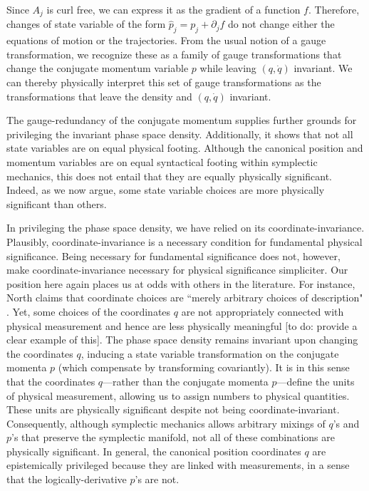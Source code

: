 \documentclass[letterpaper]{article}
\begin{document}
Since $A_j$ is curl free, we can express it as the gradient of a function $f$. Therefore, changes of state variable of the form $\hat{p}_j = p_j + \partial_j f$ do not change either the equations of motion or the trajectories. From the usual notion of a gauge transformation, we recognize these as a family of gauge transformations that change the conjugate momentum variable $p$ while leaving $(q,\dot{q}) $ invariant. We can thereby physically interpret this set of gauge transformations as the transformations that leave the density and $(q,\dot{q}) $ invariant.

The gauge-redundancy of the conjugate momentum supplies further grounds for privileging the invariant phase space density. Additionally, it shows that not all state variables are on equal physical footing. Although the canonical position and momentum variables are on equal syntactical footing within symplectic mechanics, this does not entail that they are equally physically significant. Indeed, as we now argue, some state variable choices are more physically significant than others.

In privileging the phase space density, we have relied on its coordinate-invariance. Plausibly, coordinate-invariance is a necessary condition for fundamental physical significance. Being necessary for fundamental significance does not, however, make coordinate-invariance necessary for physical significance simpliciter. Our position here again places us at odds with others in the literature. For instance, North claims that coordinate choices are ``merely arbitrary choices of description" \parencites*[61]{North}. Yet, some choices of the coordinates $q$ are not appropriately connected with physical measurement and hence are less physically meaningful [to do: provide a clear example of this]. The phase space density remains invariant upon changing the coordinates $q$, inducing a state variable transformation on the conjugate momenta $p$ (which compensate by transforming covariantly). It is in this sense that the coordinates $q$---rather than the conjugate momenta $p$---define the units of physical measurement, allowing us to assign numbers to physical quantities. These units are physically significant despite not being coordinate-invariant. Consequently, although symplectic mechanics allows arbitrary mixings of $q$'s and $p$'s that preserve the symplectic manifold, not all of these combinations are physically significant. In general, the canonical position coordinates $q$ are epistemically privileged because they are linked with measurements, in a sense that the logically-derivative  $p$'s are not. 
\end{document}
